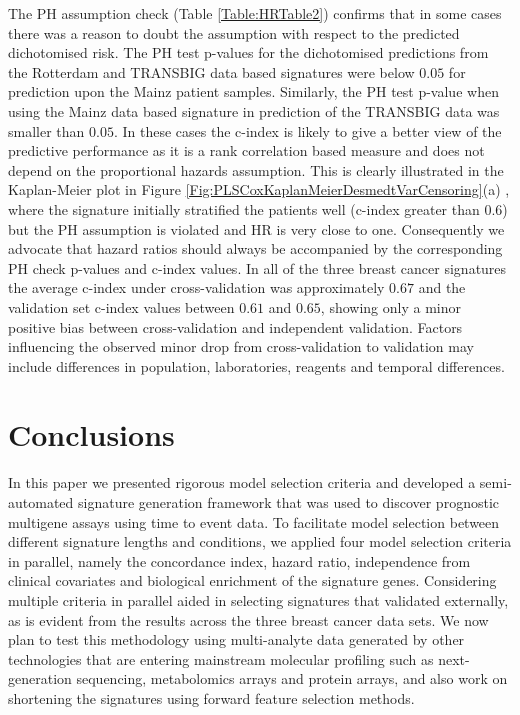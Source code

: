 \documentclass[letterpaper,12pt]{article}
\begin{document}
The PH assumption check (Table \ref{Table:HRTable2}) confirms that in some cases there was a reason to doubt the assumption with respect to the predicted dichotomised risk. The PH test p-values for the dichotomised predictions from the Rotterdam and TRANSBIG data based signatures were below $0.05$ for prediction upon the Mainz patient samples. Similarly, the PH test p-value when using the Mainz data based signature in prediction of the TRANSBIG data was smaller than $0.05$. In these cases the c-index is likely to give a better view of the predictive performance as it is a rank correlation based measure and does not depend on the proportional hazards assumption. This is clearly illustrated in the Kaplan-Meier plot in Figure \ref{Fig:PLSCoxKaplanMeierDesmedtVarCensoring}(a)%
, where the signature initially stratified the patients well (c-index greater than $0.6$) but the PH assumption is violated and HR is very close to one. Consequently we advocate that hazard ratios should always be accompanied by the corresponding PH check p-values and c-index values. In all of the three breast cancer signatures the average c-index under cross-validation was approximately $0.67$ and the validation set c-index values between $0.61$ and $0.65$, showing only a minor positive bias between cross-validation and independent validation. Factors influencing the observed minor drop from cross-validation to validation may include differences in population, laboratories, reagents and temporal differences. 

\section{Conclusions}
In this paper we presented rigorous model selection criteria and developed a semi-automated signature generation framework that was used to discover prognostic multigene assays using time to event data. To facilitate model selection between different signature lengths and conditions, we applied four model selection criteria in parallel, namely the concordance index, hazard ratio, independence from clinical covariates and biological enrichment of the signature genes. Considering multiple criteria in parallel aided in selecting signatures that validated externally, as is evident from the results across the three breast cancer data sets.  We now plan to test this methodology using multi-analyte data generated by other technologies that are entering mainstream molecular profiling such as next-generation sequencing, metabolomics arrays and protein arrays, and also work on shortening the signatures using forward feature selection methods.
\end{document}
